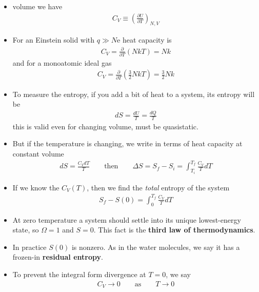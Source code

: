 \documentclass{book}
\begin{document}
\begin{itemize}
	\item	volume we have
	      \begin{align}
		      C_V \equiv \left( \frac{\partial U}{\partial T} \right)_{N,V}
	      \end{align}
	\item For an Einstein solid with $ q \gg N $e heat capacity is
	      \begin{align}
		      C_V = \frac{\partial }{\partial T} (NkT)  = Nk
	      \end{align}
	      and for a monoatomic ideal gas
	      \begin{align}
		      C_V = \frac{\partial }{\partial T} \left( \frac{3}{2} NkT \right) = \frac{3}{2} Nk
	      \end{align}

	\item To measure the entropy, if you add a bit of heat to a system, its entropy will be
	      \begin{align}
		      dS = \frac{dU}{T} = \frac{dQ}{T}
	      \end{align}
	      this is valid even for changing volume, must be quasistatic.
	\item But if the temperature is changing, we write in terms of heat capacity at constant volume
	      \begin{align}
		      dS = \frac{C_V dT}{T} \qquad \text{then} \qquad
		      \Delta{S} = S_f - S_i = \int_{T_i}^{T_f} \frac{C_{V}}{T} dT
	      \end{align}
	\item If we know the $C_{V}(T)$, then we find the \textit{total} entropy of the system
	      \begin{align}
		      S_f - S(0) = \int_{0}^{T_f} \frac{C_V}{T} dT
	      \end{align}
	\item At zero temperature a system should settle into its unique lowest-energy state,
	      so $ \Omega=1 $ and $ S=0 $. This fact is the \textbf{third law of thermodynamics}.
	\item In practice $ S(0) $ is nonzero. As in the water molecules, we say it has a frozen-in \textbf{residual entropy}.
	\item To prevent the integral form divergence at $ T=0 $, we say
	      \begin{align}
		      C_{V} \to 0 \qquad \text{as} \qquad T \to 0
	      \end{align}
\end{itemize}
\end{document}
